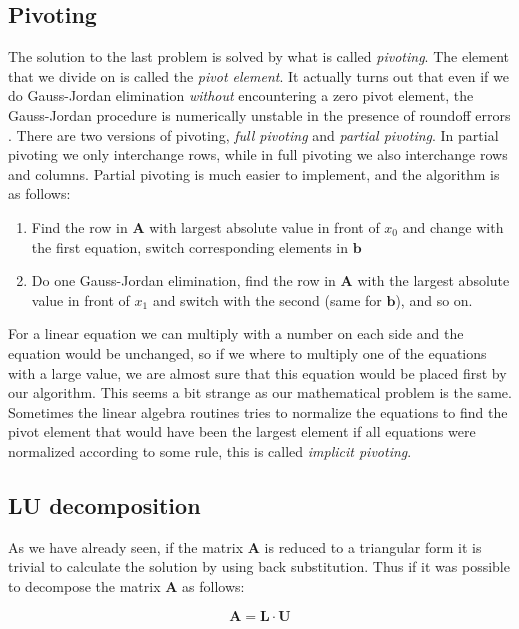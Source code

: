 \documentclass[graybox,sectrefs,envcountresetchap,open=right,final]{svmonodo}
\begin{document}
\subsection{Pivoting}
The solution to the last problem is solved by what is called \emph{pivoting}. The element that we divide on is called the \emph{pivot element}. It actually turns out that even if we do Gauss-Jordan elimination \emph{without} encountering a zero pivot element, the Gauss-Jordan procedure is numerically unstable in the presence of roundoff errors \cite{press2007}. There are two versions of pivoting, \emph{full pivoting} and \emph{partial pivoting}. In partial pivoting we only interchange rows, while in full pivoting we also interchange rows and columns. Partial pivoting is much easier to implement, and the algorithm is as follows:
\begin{enumerate}
\item Find the row in $\mathbf{A}$ with largest absolute value in front of $x_0$ and change with the first equation, switch corresponding elements in $\mathbf{b}$

\item Do one Gauss-Jordan elimination, find the row in $\mathbf{A}$ with the largest absolute value in front of $x_1$ and switch with the second (same for $\mathbf{b}$), and so on.
\end{enumerate}

\noindent
For a linear equation we can multiply with a number on each side and the equation would be unchanged, so if we where to multiply one of the equations with a large value, we are almost sure that this equation would be placed first by our algorithm. This seems a bit strange as our mathematical problem is the same. Sometimes the linear algebra routines tries to normalize the equations to find the pivot element that would have been the largest element if all equations were normalized according to some rule, this is called \emph{implicit pivoting}.  
\subsection{LU decomposition}
As we have already seen, if the matrix $\mathbf{A}$ is reduced to a triangular form it is trivial to calculate the solution by using back substitution. Thus if it was possible to decompose the matrix $\mathbf{A}$ as follows:

\begin{equation}
\mathbf{A}=\mathbf{L}\cdot\mathbf{U}\label{eq:lin:lu}
\end{equation}
\end{document}
